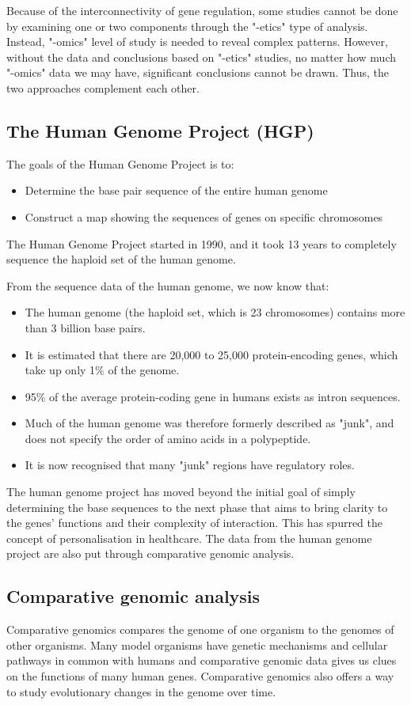\documentclass[11pt]{article}
\begin{document}
Because of the interconnectivity of gene regulation, some studies cannot be done by examining one or two components through the "-etics" type of analysis. Instead, "-omics" level of study is needed to reveal complex patterns. However, without the data and conclusions based on "-etics" studies, no matter how much "-omics" data we may have, significant conclusions cannot be drawn. Thus, the two approaches complement each other.

\newpage
\subsection{The Human Genome Project (HGP)}
\label{sec:org1ffe304}
The goals of the Human Genome Project is to:
\begin{itemize}
\item Determine the base pair sequence of the entire human genome
\item Construct a map showing the sequences of genes on specific chromosomes
\end{itemize}

The Human Genome Project started in 1990, and it took 13 years to completely sequence the haploid set of the human genome.


From the sequence data of the human genome, we now know that:
\begin{itemize}
\item The human genome (the haploid set, which is 23 chromosomes) contains more than 3 billion base pairs.
\item It is estimated that there are 20,000 to 25,000 protein-encoding genes, which take up only 1\% of the genome.
\item 95\% of the average protein-coding gene in humans exists as intron sequences.
\item Much of the human genome was therefore formerly described as "junk", and does not specify the order of amino acids in a polypeptide.
\item It is now recognised that many "junk" regions have regulatory roles.
\end{itemize}

The human genome project has moved beyond the initial goal of simply determining the base sequences to the next phase that aims to bring clarity to the genes' functions and their complexity of interaction. This has spurred the concept of personalisation in healthcare. The data from the human genome project are also put through comparative genomic analysis.
\subsection{Comparative genomic analysis}
\label{sec:orgbb55217}
Comparative genomics compares the genome of one organism to the genomes of other organisms. Many model organisms have genetic mechanisms and cellular pathways in common with humans and comparative genomic data gives us clues on the functions of many human genes. Comparative genomics also offers a way to study evolutionary changes in the genome over time.
\end{document}
